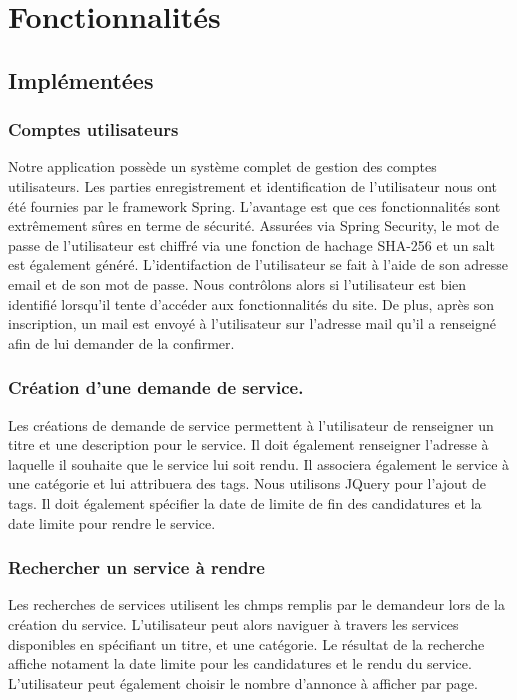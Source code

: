 \section{Fonctionnalités}

\subsection{Implémentées}

\subsubsection{Comptes utilisateurs}
Notre application possède un système complet de gestion des comptes utilisateurs. Les parties enregistrement et identification de l'utilisateur nous ont été fournies par le framework Spring. L'avantage est que ces fonctionnalités sont extrêmement sûres en terme de sécurité. Assurées via Spring Security, le mot de passe de l'utilisateur est chiffré via une fonction de hachage SHA-256 et un salt est également généré. L'identifaction de l'utilisateur se fait à l'aide de son adresse email et de son mot de passe.
\newline
Nous contrôlons alors si l'utilisateur est bien identifié lorsqu'il tente d'accéder aux fonctionnalités du site. De plus, après son inscription, un mail est envoyé à l'utilisateur sur l'adresse mail qu'il a renseigné afin de lui demander de la confirmer.

\subsubsection{Création d'une demande de service.}
Les créations de demande de service permettent à l'utilisateur de renseigner un titre et une description pour le service. Il doit également renseigner l'adresse  à laquelle il souhaite que le service lui soit rendu. Il associera également le service à une catégorie et lui attribuera des tags. Nous utilisons JQuery pour l'ajout de tags. Il doit également spécifier la date de limite de fin des candidatures et la date limite pour rendre le service.

\subsubsection{Rechercher un service à rendre}
Les recherches de services utilisent les chmps remplis par le demandeur lors de la création du service. L'utilisateur peut alors naviguer à travers les services disponibles en spécifiant un titre, et une catégorie. Le résultat de la recherche affiche notament la date limite pour les candidatures et le rendu du service. L'utilisateur peut également choisir le nombre d'annonce à afficher par page.


